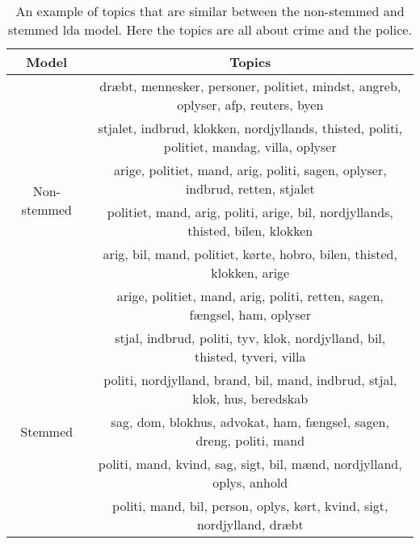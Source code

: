 \begin{table}
	\caption{An example of topics that are similar between the non-stemmed and stemmed \gls{lda} model.
		Here the topics are all about crime and the police.}
	\label{tab:topic_examples}
	\centering
	\begin{tabular}{c|c}
		Model & Topics \\
		\midrule
		\multirow{6}{*}{Non-stemmed} & dræbt, mennesker, personer, politiet, mindst, angreb, oplyser, afp, reuters, byen  \\
		 & stjalet, indbrud, klokken, nordjyllands, thisted, politi, politiet, mandag, villa, oplyser  \\
		 & arige, politiet, mand, arig, politi, sagen, oplyser, indbrud, retten, stjalet  \\
		 & politiet, mand, arig, politi, arige, bil, nordjyllands, thisted, bilen, klokken  \\
		 & arig, bil, mand, politiet, kørte, hobro, bilen, thisted, klokken, arige  \\
		 & arige, politiet, mand, arig, politi, retten, sagen, fængsel, ham, oplyser  \\
		\midrule
		\multirow{5}{*}{Stemmed} & stjal, indbrud, politi, tyv, klok, nordjylland, bil, thisted, tyveri, villa  \\
		 & politi, nordjylland, brand, bil, mand, indbrud, stjal, klok, hus, beredskab  \\
		 & sag, dom, blokhus, advokat, ham, fængsel, sagen, dreng, politi, mand  \\
		 & politi, mand, kvind, sag, sigt, bil, mænd, nordjylland, oplys, anhold  \\
		 & politi, mand, bil, person, oplys, kørt, kvind, sigt, nordjylland, dræbt  \\
	\end{tabular}
\end{table}